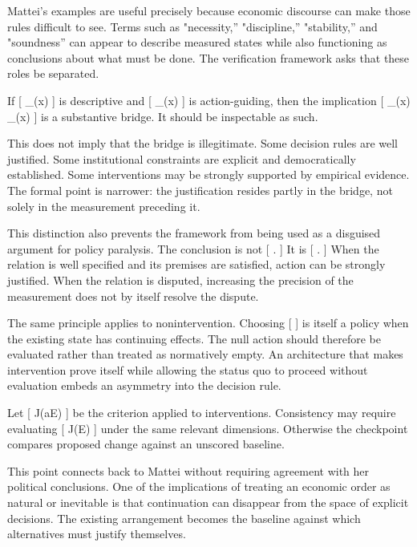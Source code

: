\documentclass[11pt]{article}
\begin{document}
Mattei's examples are useful precisely because economic discourse can make those rules difficult to see. Terms such as "necessity,'' "discipline,'' "stability,'' and "soundness'' can appear to describe measured states while also functioning as conclusions about what must be done. The verification framework asks that these roles be separated.

If
[
\Phi_{}(x)
]
is descriptive and
[
\Phi_{}(x)
]
is action-guiding, then the implication
[
\Phi_{}(x)
\Longrightarrow
\Phi_{}(x)
]
is a substantive bridge. It should be inspectable as such.

This does not imply that the bridge is illegitimate. Some decision rules are well justified. Some institutional constraints are explicit and democratically established. Some interventions may be strongly supported by empirical evidence. The formal point is narrower: the justification resides partly in the bridge, not solely in the measurement preceding it.

This distinction also prevents the framework from being used as a disguised argument for policy paralysis. The conclusion is not
[
.
]
It is
[
.
]
When the relation is well specified and its premises are satisfied, action can be strongly justified. When the relation is disputed, increasing the precision of the measurement does not by itself resolve the dispute.

The same principle applies to nonintervention. Choosing
[
\varnothing
]
is itself a policy when the existing state has continuing effects. The null action should therefore be evaluated rather than treated as normatively empty. An architecture that makes intervention prove itself while allowing the status quo to proceed without evaluation embeds an asymmetry into the decision rule.

Let
[
J(a\mid E)
]
be the criterion applied to interventions. Consistency may require evaluating
[
J(\varnothing\mid E)
]
under the same relevant dimensions. Otherwise the checkpoint compares proposed change against an unscored baseline.

This point connects back to Mattei without requiring agreement with her political conclusions. One of the implications of treating an economic order as natural or inevitable is that continuation can disappear from the space of explicit decisions. The existing arrangement becomes the baseline against which alternatives must justify themselves.
\end{document}
